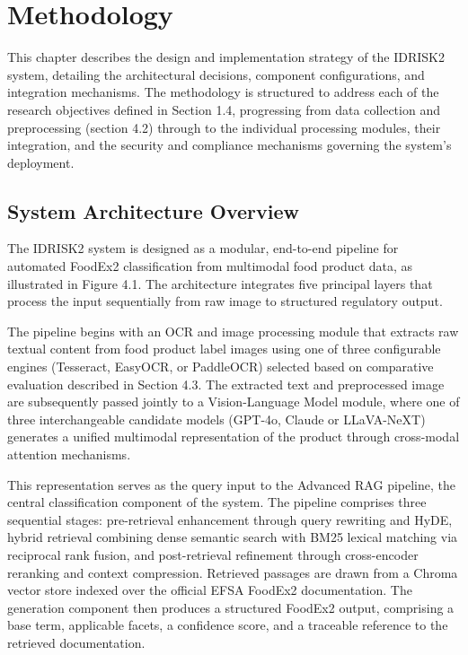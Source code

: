 \hypertarget{methodology}{%
\chapter{Methodology}\label{methodology}}

This chapter describes the design and implementation strategy of the IDRISK2 system, detailing the architectural decisions, component configurations, and integration mechanisms. The methodology is structured to address each of the research objectives defined in Section 1.4, progressing from data collection and preprocessing (section 4.2) through to the individual processing modules, their integration, and the security and compliance mechanisms governing the system's deployment.

\hypertarget{system-architecture-overview}{%
\section{System Architecture Overview}\label{system-architecture-overview}}

The IDRISK2 system is designed as a modular, end-to-end pipeline for automated FoodEx2 classification from multimodal food product data, as illustrated in Figure 4.1. The architecture integrates five principal layers that process the input sequentially from raw image to structured regulatory output.

The pipeline begins with an OCR and image processing module that extracts raw textual content from food product label images using one of three configurable engines (Tesseract, EasyOCR, or PaddleOCR) selected based on comparative evaluation described in Section 4.3. The extracted text and preprocessed image are subsequently passed jointly to a Vision-Language Model module, where one of three interchangeable candidate models (GPT-4o, Claude or LLaVA-NeXT) generates a unified multimodal representation of the product through cross-modal attention mechanisms.

This representation serves as the query input to the Advanced RAG pipeline, the central classification component of the system. The pipeline comprises three sequential stages: pre-retrieval enhancement through query rewriting and HyDE, hybrid retrieval combining dense semantic search with BM25 lexical matching via reciprocal rank fusion, and post-retrieval refinement through cross-encoder reranking and context compression. Retrieved passages are drawn from a Chroma vector store indexed over the official EFSA FoodEx2 documentation. The generation component then produces a structured FoodEx2 output, comprising a base term, applicable facets, a confidence score, and a traceable reference to the retrieved documentation.


